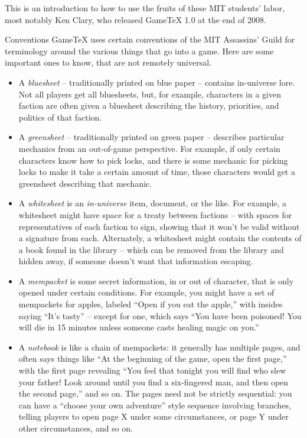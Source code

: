 \documentclass{article}
\begin{document}
This is an introduction to how to use the fruits of these MIT students' labor, most notably Ken Clary, who released GameTeX 1.0 at the end of 2008.

\begin{section}{Conventions}
GameTeX uses certain conventions of the MIT Assassins' Guild for terminology around the various things that go into a game.  Here are some important ones to know, that are not remotely universal.
\begin{itemize}
    \item A \textit{bluesheet} -- traditionally printed on blue paper -- contains in-universe lore.  Not all players get all bluesheets, but, for example, characters in a given faction are often given a bluesheet describing the history, priorities, and politics of that faction.
    \item A \textit{greensheet} -- traditionally printed on green paper -- describes particular mechanics from an out-of-game perspective.  For example, if only certain characters know how to pick locks, and there is some mechanic for picking locks to make it take a certain amount of time, those characters would get a greensheet describing that mechanic.
    \item A \textit{whitesheet} is an \emph{in-universe} item, document, or the like.  For example, a whitesheet might have space for a treaty between factions -- with spaces for representatives of each faction to sign, showing that it won't be valid without a signature from each.  Alternately, a whitesheet might contain the contents of a book found in the library -- which can be removed from the library and hidden away, if someone doesn't want that information escaping.
    \item A \textit{mempacket} is some secret information, in or out of character, that is only opened under certain conditions.  For example, you might have a set of mempackets for apples, labeled ``Open if you eat the apple,'' with insides saying ``It's tasty'' -- except for one, which says ``You have been poisoned!  You will die in 15 minutes unless someone casts healing magic on you.''
    \item A \textit{notebook} is like a chain of mempackets: it generally has multiple pages, and often says things like ``At the beginning of the game, open the first page,'' with the first page revealing ``You feel that tonight you will find who slew your father!  Look around until you find a six-fingered man, and then open the second page,'' and so on.  
    The pages need not be strictly sequential: you can have a ``choose your own adventure'' style sequence involving branches, telling players to open page X under some circumstances, or page Y under other circumstances, and so on.
\end{itemize}


\end{section}
\end{document}
